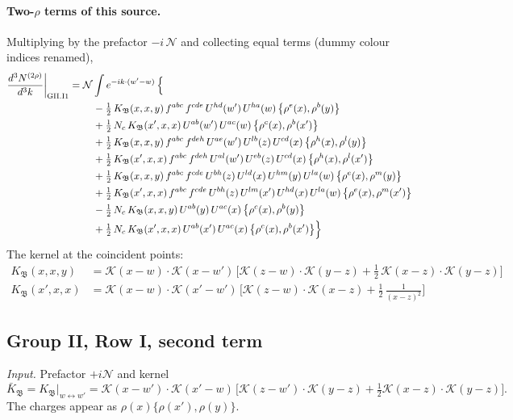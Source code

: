 \documentclass[10pt]{article}
\numberwithin{equation}{section}
\newcommand{\KK}{\mathcal K}
\newcommand{\NN}{\mathcal N}
\begin{document}
\paragraph{Two-$\rho$ terms of this source.} Multiplying by the prefactor $-i\,\NN$ and collecting equal terms (dummy colour indices renamed),
\begin{align}
\frac{d^3N^{(2\rho)}}{d^3k}\bigg|_{\rm GII.I1}={}&\NN\int e^{-ik\cdot(w'-w)}\,\Big\{\notag\\
&\quad -\tfrac12\,K_{\mathfrak B}(x,x,y)\,f^{abc}\,f^{cde}\,U^{hd}(w')\,U^{ha}(w)\,\big\{\rho^{e}(x),\rho^{b}(y)\big\}\notag\\
&\quad +\tfrac12\,N_{c}\,K_{\mathfrak B}(x',x,x)\,U^{ab}(w')\,U^{ac}(w)\,\big\{\rho^{c}(x),\rho^{b}(x')\big\}\notag\\
&\quad +\tfrac12\,K_{\mathfrak B}(x,x,y)\,f^{abc}\,f^{deh}\,U^{ae}(w')\,U^{lb}(z)\,U^{cd}(x)\,\big\{\rho^{h}(x),\rho^{l}(y)\big\}\notag\\
&\quad +\tfrac12\,K_{\mathfrak B}(x',x,x)\,f^{abc}\,f^{deh}\,U^{al}(w')\,U^{eb}(z)\,U^{cd}(x)\,\big\{\rho^{h}(x),\rho^{l}(x')\big\}\notag\\
&\quad +\tfrac12\,K_{\mathfrak B}(x,x,y)\,f^{abc}\,f^{cde}\,U^{bh}(z)\,U^{ld}(x)\,U^{hm}(y)\,U^{la}(w)\,\big\{\rho^{e}(x),\rho^{m}(y)\big\}\notag\\
&\quad +\tfrac12\,K_{\mathfrak B}(x',x,x)\,f^{abc}\,f^{cde}\,U^{bh}(z)\,U^{lm}(x')\,U^{hd}(x)\,U^{la}(w)\,\big\{\rho^{e}(x),\rho^{m}(x')\big\}\notag\\
&\quad -\tfrac12\,N_{c}\,K_{\mathfrak B}(x,x,y)\,U^{ab}(y)\,U^{ac}(x)\,\big\{\rho^{c}(x),\rho^{b}(y)\big\}\notag\\
&\quad +\tfrac12\,N_{c}\,K_{\mathfrak B}(x',x,x)\,U^{ab}(x')\,U^{ac}(x)\,\big\{\rho^{c}(x),\rho^{b}(x')\big\}\Big\}\label{eq:res-GII.I1}
\end{align}
The kernel at the coincident points:
\begin{align*}
K_{\mathfrak B}(x,x,y)&=\KK(x-w)\cdot\KK(x-w')\,\Big[\KK(z-w)\cdot\KK(y-z)+\tfrac12\,\KK(x-z)\cdot\KK(y-z)\Big]\\K_{\mathfrak B}(x',x,x)&=\KK(x-w)\cdot\KK(x'-w')\,\Big[\KK(z-w)\cdot\KK(x-z)+\tfrac12\,\frac{1}{(x-z)^2}\Big]
\end{align*}
\subsection{Group II, Row I, second term}\label{sec:GII.I2}
\emph{Input.} Prefactor $+i\NN$ and kernel
\begin{equation*}
\bar K_{\mathfrak B}=K_{\mathfrak B}\big|_{w\leftrightarrow w'}=\KK(x-w')\cdot\KK(x'-w)\,\big[\KK(z-w')\cdot\KK(y-z)+\tfrac12\KK(x-z)\cdot\KK(y-z)\big].
\end{equation*}
The charges appear as $\rho(x)\{\rho(x'),\rho(y)\}$.
\end{document}

